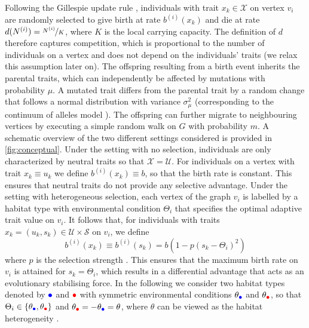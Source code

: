 Following the Gillespie update rule \citep{Gillespie1976}, individuals with trait $x_k \in \mathcal{X}$ on vertex $v_i$ are randomly selected to give birth at rate $b^{(i)}(x_k)$ and die at rate $d(N^{(i)}) = \nicefrac{N^{(i)}}{K}$, where $K$ is the local carrying capacity. 
% 
The definition of $d$ therefore captures competition, which is proportional to the number of individuals on a vertex and does not depend on the individuals' traits (we relax this assumption later on).
%
The offspring resulting from a birth event inherits the parental traits, which can independently be affected by mutations with probability $\mu$. A mutated trait differs from the parental trait by a random change that follows a normal distribution with variance $\sigma_\mu^2$ (corresponding to the continuum of alleles model \citep{Kimura1964}). The offspring can further migrate to neighbouring vertices by executing a simple random walk on $G$ with probability $m$.
%
A schematic overview of the two different settings considered is provided in \cref{fig:conceptual}. Under the setting with no selection, individuals are only characterized by neutral traits so that $\mathcal{X} = \mathcal{U}$.
%
For individuals on a vertex with trait $x_k\equiv u_k$ we define $b^{(i)}(x_k) \equiv b$, so that the birth rate is constant. This ensures that neutral traits do not provide any selective advantage.
%
Under the setting with heterogeneous selection, each vertex of the graph $v_i$ is labelled by a habitat type with environmental condition $\Theta_i$ that specifies the optimal adaptive trait value on $v_i$. It follows that, for individuals with traits $x_k = (u_k,s_k) \in \mathcal{U}\times \mathcal{S}$ on $v_i$, we define 
\begin{equation} \label{eq:birth_fun}
 b^{(i)}(x_k) \equiv b^{(i)}(s_k) = b(1 - p(s_k - \Theta_i)^2)
\end{equation}
%
where $p$ is the selection strength \citep{Mirrahimi2020}. This ensures that the maximum birth rate on $v_i$ is attained for $s_k = \Theta_i$, which results in a differential advantage that acts as an evolutionary stabilising force. In the following we consider two habitat types denoted by $\bcirc$ and $\rcirc$ with symmetric environmental conditions $\theta_{\bcirc}$ and $\theta_{\rcirc}$, so that $\Theta_i \in \{\theta_{\bcirc},\theta_{\rcirc}\}$ and $\theta_{\rcirc} = -\theta_{\bcirc} = \theta$, where $\theta$ can be viewed as the habitat heterogeneity \citep{Mirrahimi2020}.

